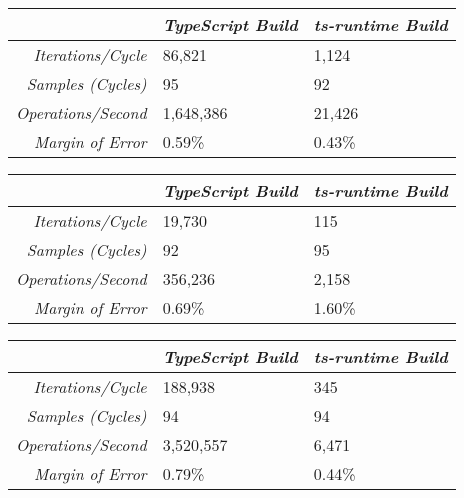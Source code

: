 \begin{center}
{
\centering
\tabulinesep=1.2mm
\setlength{\tabcolsep}{5mm}
\def\arraystretch{1.25}
\small
\begin{tabu} to \textwidth {|r||X[c,m]|X[c,m]|}
  \hline
  & \emph{TypeScript Build} & \emph{ts-runtime Build} \\
  \hline
  \hline
  \emph{Iterations/Cycle}  & 86,821 & 1,124 \\
  \hline
  \emph{Samples (Cycles)}  & 95 & 92 \\
  \hline
  \emph{Operations/Second} & 1,648,386 & 21,426 \\
  \hline
  \emph{Margin of Error}   & 0.59\% & 0.43\% \\
  \hline
\end{tabu}
}
\end{center}

\begin{center}
{
\centering
\tabulinesep=1.2mm
\setlength{\tabcolsep}{5mm}
\def\arraystretch{1.25}
\small
\begin{tabu} to \textwidth {|r||X[c,m]|X[c,m]|}
  \hline
  & \emph{TypeScript Build} & \emph{ts-runtime Build} \\
  \hline
  \hline
  \emph{Iterations/Cycle}  & 19,730 & 115 \\
  \hline
  \emph{Samples (Cycles)}  & 92 & 95 \\
  \hline
  \emph{Operations/Second} & 356,236 & 2,158 \\
  \hline
  \emph{Margin of Error}   & 0.69\% & 1.60\% \\
  \hline
\end{tabu}
}
\end{center}

\begin{center}
{
\centering
\tabulinesep=1.2mm
\setlength{\tabcolsep}{5mm}
\def\arraystretch{1.25}
\small
\begin{tabu} to \textwidth {|r||X[c,m]|X[c,m]|}
  \hline
  & \emph{TypeScript Build} & \emph{ts-runtime Build} \\
  \hline
  \hline
  \emph{Iterations/Cycle}  & 188,938 & 345 \\
  \hline
  \emph{Samples (Cycles)}  & 94 & 94 \\
  \hline
  \emph{Operations/Second} & 3,520,557 & 6,471 \\
  \hline
  \emph{Margin of Error}   & 0.79\% & 0.44\% \\
  \hline
\end{tabu}
}
\end{center}

